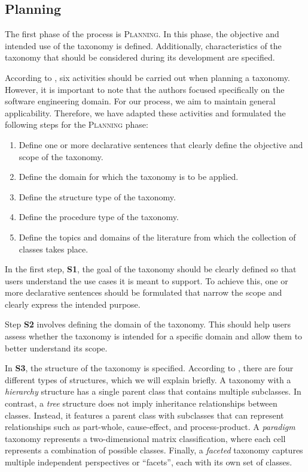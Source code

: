 \subsection{Planning}
\label{sec:tax_dev_planning}

The first phase of the process is \textsc{Planning}. In this phase, the objective and intended use of the taxonomy is defined. Additionally, characteristics of the taxonomy that should be considered during its development are specified.

According to \textcite{usman_taxonomies_2017}, six activities should be carried out when planning a taxonomy. However, it is important to note that the authors focused specifically on the software engineering domain. For our process, we aim to maintain general applicability. Therefore, we have adapted these activities and formulated the following steps for the \textsc{Planning} phase:


\begin{enumerate}[label=\textbf{S\arabic*:}, leftmargin=2.5em]
    \item \label{enum:step1} Define one or more declarative sentences that clearly define the objective and scope of the taxonomy.
    \item \label{enum:step2} Define the domain for which the taxonomy is to be applied.
    \item \label{enum:step3} Define the structure type of the taxonomy.
    \item \label{enum:step4} Define the procedure type of the taxonomy.
    \item \label{enum:step5} Define the topics and domains of the literature from which the collection of classes takes place.
\end{enumerate}

In the first step, \textbf{S1}, the goal of the taxonomy should be clearly defined so that users understand the use cases it is meant to support. To achieve this, one or more declarative sentences should be formulated that narrow the scope and clearly express the intended purpose. 

Step \textbf{S2} involves defining the domain of the taxonomy. This should help users assess whether the taxonomy is intended for a specific domain and allow them to better understand its scope.

In \textbf{S3}, the structure of the taxonomy is specified. According to \textcite{usman_taxonomies_2017}, there are four different types of structures, which we will explain briefly. A taxonomy with a \emph{hierarchy} structure has a single parent class that contains multiple subclasses. In contrast, a \emph{tree} structure does not imply inheritance relationships between classes. Instead, it features a parent class with subclasses that can represent relationships such as part-whole, cause-effect, and process-product. A \emph{paradigm} taxonomy represents a two-dimensional matrix classification, where each cell represents a combination of possible classes. Finally, a \emph{faceted} taxonomy captures multiple independent perspectives or \enquote{facets}, each with its own set of classes.

